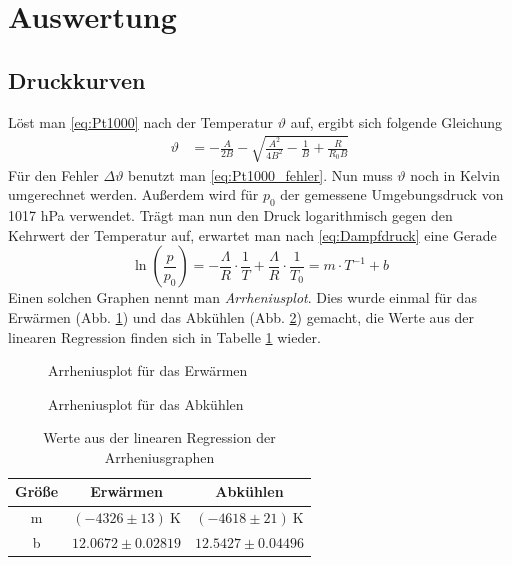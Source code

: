 \documentclass[12pt,a4paper,titlepage,headinclude,bibtotoc]{scrartcl}
\begin{document}
\section{Auswertung}
\label{sec:auswertung}
\subsection{Druckkurven}
Löst man \eqref{eq:Pt1000} nach der Temperatur $\vartheta$ auf, ergibt sich folgende Gleichung
\begin{align}
	\vartheta&=-\frac{A}{2B}-\sqrt{\frac{A^2}{4B^2}-\frac{1}{B}+\frac{R}{R_0 B}}
\end{align}
Für den Fehler $\Delta\vartheta$ benutzt man \eqref{eq:Pt1000_fehler}.
Nun muss $\vartheta$ noch in Kelvin umgerechnet werden.
Außerdem wird für $p_0$ der gemessene Umgebungsdruck von 1017 hPa verwendet.
Trägt man nun den Druck logarithmisch gegen den Kehrwert der Temperatur auf, erwartet man nach \eqref{eq:Dampfdruck} eine Gerade $$\ln\left(\frac{p}{p_0}\right) = -\frac{\Lambda}{R}\cdot\frac{1}{T}+\frac{\Lambda}{R}\cdot \frac{1}{T_0} = m \cdot T^{-1} + b$$
Einen solchen Graphen nennt man \textit{Arrheniusplot}.
Dies wurde einmal für das Erwärmen (Abb. \ref{fig:mess1}) und das Abkühlen (Abb. \ref{fig:mess2}) gemacht, die Werte aus der linearen Regression finden sich in Tabelle \ref{tab:regErg} wieder.

\begin{figure}[!htb]
	\centering
	
	\caption{Arrheniusplot für das Erwärmen}
	\label{fig:mess1}
\end{figure}

\begin{figure}[!htb]
	\centering
	
	\caption{Arrheniusplot für das Abkühlen}
	\label{fig:mess2}
\end{figure}

\begin{table}[!htb]
 \centering
 \begin{tabular}{|c|c|c|}
  \hline
  Größe&Erwärmen&Abkühlen\\
  \hline
  m & $(-4326 \pm 13)~\si{\kelvin}$ & $(-4618 \pm 21)~\si{\kelvin}$ \\
  b & $12.0672  \pm 0.02819$ & $12.5427 \pm 0.04496$ \\
  \hline
 \end{tabular}
 \caption{Werte aus der linearen Regression der Arrheniusgraphen} 
 \label{tab:regErg}
\end{table}
\end{document}

